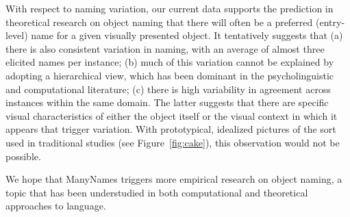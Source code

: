 

With respect to naming variation, our current data supports the prediction in theoretical research on object naming that there will often be a preferred (entry-level) name for a given visually presented object.
It tentatively suggests that (a) there is also consistent variation in naming, with an average of almost three elicited names per instance; (b) much of this variation cannot be explained by adopting a hierarchical view, which has been dominant in the psycholinguistic and computational literature; (c) there is high variability in agreement across instances within the same domain.
The latter suggests that there are specific visual characteristics of either the object itself or the visual context in which it appears that trigger variation. With prototypical, idealized pictures of the sort used in traditional studies (see Figure\ \ref{fig:cake}), this observation would not be possible.

We hope that ManyNames triggers more empirical research on object naming, a topic that has been understudied in both computational and theoretical approaches to language.

